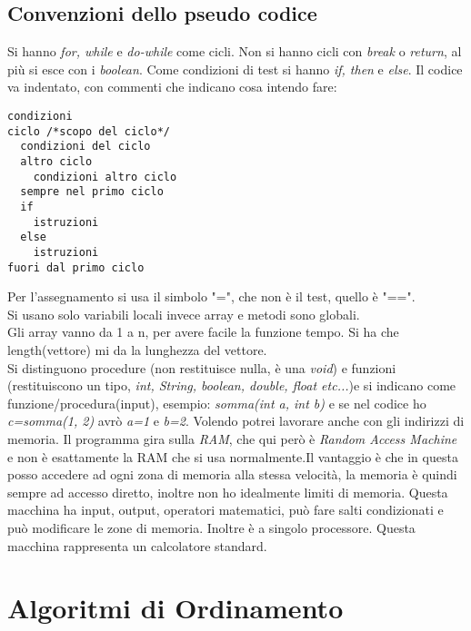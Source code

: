\documentclass[a4paper,12pt,oneside,tikz]{book}
\begin{document}
\subsection{Convenzioni dello pseudo codice}
Si hanno \textit{for, while} e \textit{do-while} come cicli. Non si hanno cicli con \textit{break} o \textit{return}, al più si esce con i \textit{boolean}. Come condizioni di test si hanno \textit{if, then} e \textit{else}. Il codice va indentato, con commenti che indicano cosa intendo fare:
\begin{verbatim}
condizioni
ciclo /*scopo del ciclo*/
  condizioni del ciclo
  altro ciclo
    condizioni altro ciclo
  sempre nel primo ciclo
  if
    istruzioni
  else 
    istruzioni
fuori dal primo ciclo
\end{verbatim}
Per l'assegnamento si usa il simbolo "=", che non è il test, quello è "==".\\
Si usano solo variabili locali invece array e metodi sono globali.\\
Gli array vanno da 1 a n, per avere facile la funzione tempo. Si ha che length(vettore) mi da la lunghezza del vettore.\\Si distinguono procedure (non restituisce nulla, è una \textit{void}) e funzioni (restituiscono un tipo, \textit{int, String, boolean, double, float etc...})e si indicano come funzione/procedura(input), esempio: \textit{somma(int a, int b)} e se nel codice ho \textit{c=somma(1, 2)} avrò \textit{a=1} e \textit{b=2}. Volendo potrei lavorare anche con gli indirizzi di memoria. Il programma gira sulla \textit{RAM}, che qui però è \textit{Random Access Machine} e non è esattamente la RAM che si usa normalmente.Il vantaggio è che in questa posso accedere ad ogni zona di memoria alla stessa velocità, la memoria è quindi sempre ad accesso diretto, inoltre non ho idealmente limiti di memoria. Questa macchina ha input, output, operatori matematici, può fare salti condizionati  e può modificare le zone di memoria. Inoltre è a singolo processore. Questa macchina rappresenta un calcolatore standard.
\newpage
\section{Algoritmi di Ordinamento}
\end{document}
